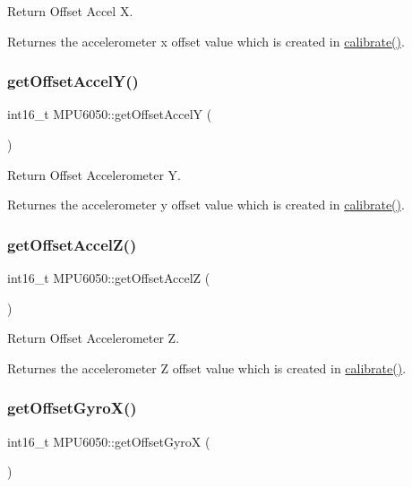 Return Offset Accel X. 

Returnes the accelerometer x offset value which is created in \mbox{\hyperlink{class_m_p_u6050_a35657154dd30e206e09ea6407ede106c}{calibrate()}}. \mbox{\label{class_m_p_u6050_a7e5f5deae1205dd2877da8c53f62bafc}} 
\subsubsection{\texorpdfstring{get\+Offset\+Accel\+Y()}{getOffsetAccelY()}}
{\footnotesize\ttfamily int16\+\_\+t M\+P\+U6050\+::get\+Offset\+AccelY (\begin{DoxyParamCaption}{ }\end{DoxyParamCaption})}



Return Offset Accelerometer Y. 

Returnes the accelerometer y offset value which is created in \mbox{\hyperlink{class_m_p_u6050_a35657154dd30e206e09ea6407ede106c}{calibrate()}}. \mbox{\label{class_m_p_u6050_abc8a1ecec8e5ac7f83d9162ec5c55eb3}} 
\subsubsection{\texorpdfstring{get\+Offset\+Accel\+Z()}{getOffsetAccelZ()}}
{\footnotesize\ttfamily int16\+\_\+t M\+P\+U6050\+::get\+Offset\+AccelZ (\begin{DoxyParamCaption}{ }\end{DoxyParamCaption})}



Return Offset Accelerometer Z. 

Returnes the accelerometer Z offset value which is created in \mbox{\hyperlink{class_m_p_u6050_a35657154dd30e206e09ea6407ede106c}{calibrate()}}. \mbox{\label{class_m_p_u6050_a73866ca532c87f446dfd11cf15746054}} 
\subsubsection{\texorpdfstring{get\+Offset\+Gyro\+X()}{getOffsetGyroX()}}
{\footnotesize\ttfamily int16\+\_\+t M\+P\+U6050\+::get\+Offset\+GyroX (\begin{DoxyParamCaption}{ }\end{DoxyParamCaption})}



